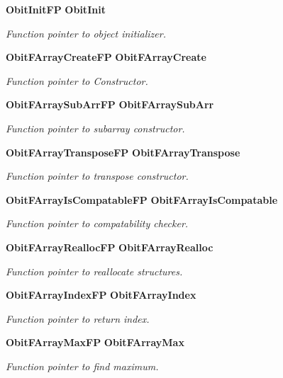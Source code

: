 \begin{CompactItemize}
{\bf Obit\-Init\-FP} {\bf Obit\-Init}
\begin{CompactList}\small\item\em Function pointer to object initializer. \item\end{CompactList}\item 
{\bf Obit\-FArray\-Create\-FP} {\bf Obit\-FArray\-Create}
\begin{CompactList}\small\item\em Function pointer to Constructor. \item\end{CompactList}\item 
{\bf Obit\-FArray\-Sub\-Arr\-FP} {\bf Obit\-FArray\-Sub\-Arr}
\begin{CompactList}\small\item\em Function pointer to subarray constructor. \item\end{CompactList}\item 
{\bf Obit\-FArray\-Transpose\-FP} {\bf Obit\-FArray\-Transpose}
\begin{CompactList}\small\item\em Function pointer to transpose constructor. \item\end{CompactList}\item 
{\bf Obit\-FArray\-Is\-Compatable\-FP} {\bf Obit\-FArray\-Is\-Compatable}
\begin{CompactList}\small\item\em Function pointer to compatability checker. \item\end{CompactList}\item 
{\bf Obit\-FArray\-Realloc\-FP} {\bf Obit\-FArray\-Realloc}
\begin{CompactList}\small\item\em Function pointer to reallocate structures. \item\end{CompactList}\item 
{\bf Obit\-FArray\-Index\-FP} {\bf Obit\-FArray\-Index}
\begin{CompactList}\small\item\em Function pointer to return index. \item\end{CompactList}\item 
{\bf Obit\-FArray\-Max\-FP} {\bf Obit\-FArray\-Max}
\begin{CompactList}\small\item\em Function pointer to find maximum. \item\end{CompactList}\item 

\end{CompactItemize}
